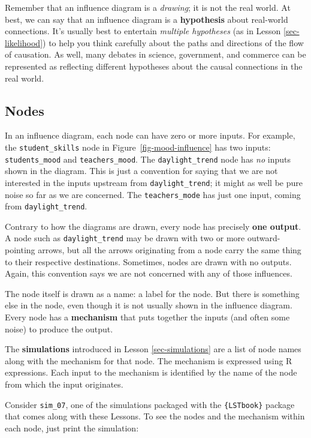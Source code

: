 \documentclass[
  letterpaper,
  DIV=11,
  numbers=noendperiod,
  oneside]{scrartcl}
\begin{document}
Remember that an influence diagram is a \emph{drawing}; it is not the
real world. At best, we can say that an influence diagram is a
\textbf{hypothesis} about real-world connections. It's usually best to
entertain \emph{multiple hypotheses} (as in Lesson \ref{sec-likelihood})
to help you think carefully about the paths and directions of the flow
of causation. As well, many debates in science, government, and commerce
can be represented as reflecting different hypotheses about the causal
connections in the real world.

\subsection{Nodes}\label{nodes}

In an influence diagram, each node can have zero or more inputs. For
example, the \texttt{student\_skills} node in
Figure~\ref{fig-mood-influence} has two inputs: \texttt{students\_mood}
and \texttt{teachers\_mood}. The \texttt{daylight\_trend} node has
\emph{no} inputs shown in the diagram. This is just a convention for
saying that we are not interested in the inputs upstream from
\texttt{daylight\_trend}; it might as well be pure noise so far as we
are concerned. The \texttt{teachers\_mode} has just one input, coming
from \texttt{daylight\_trend}.

Contrary to how the diagrams are drawn, every node has precisely
\textbf{one output}. A node such as \texttt{daylight\_trend} may be
drawn with two or more outward-pointing arrows, but all the arrows
originating from a node carry the same thing to their respective
destinations. Sometimes, nodes are drawn with no outputs. Again, this
convention says we are not concerned with any of those influences.

The node itself is drawn as a name: a label for the node. But there is
something else in the node, even though it is not usually shown in the
influence diagram. Every node has a \textbf{mechanism} that puts
together the inputs (and often some noise) to produce the output.

The \textbf{simulations} introduced in Lesson \ref{sec-simulations} are
a list of node names along with the mechanism for that node. The
mechanism is expressed using R expressions. Each input to the mechanism
is identified by the name of the node from which the input originates.

Consider \texttt{sim\_07}, one of the simulations packaged with the
\texttt{\{LSTbook\}} package that comes along with these Lessons. To see
the nodes and the mechanism within each node, just print the
simulation:{}
\end{document}
